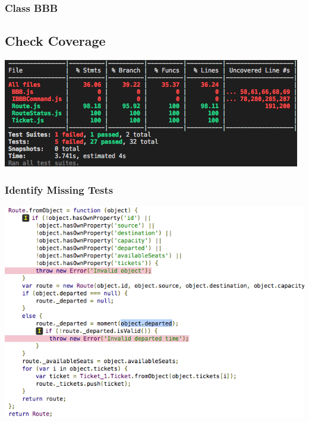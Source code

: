 \documentclass[11pt]{article}
\begin{document}
\subsubsection{Class BBB}
\label{sec:orge075818}

\subsection{Check Coverage}
\label{sec:org63d717a}

\begin{center}
\includegraphics[width=.9\linewidth]{./Iteration2.rtfd/Pasted Graphic 1.tiff.png}
\end{center}

\subsubsection{Identify Missing Tests}
\label{sec:org50f68f1}

\begin{center}
\includegraphics[width=.9\linewidth]{./Iteration2.rtfd/1_Pasted Graphic 2.tiff.png}
\end{center}
\end{document}
